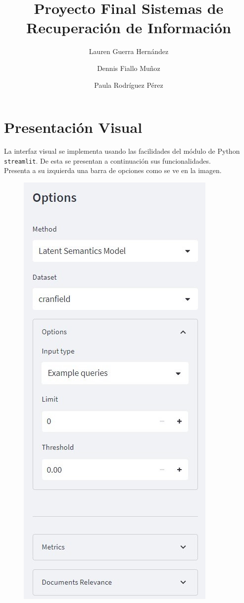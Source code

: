 \documentclass[spanish]{article}
\title{Proyecto Final Sistemas de Recuperación de Información}
\author{Lauren Guerra Hernández \and Dennis Fiallo Muñoz \and Paula Rodríguez Pérez}
\begin{document}
\maketitle

\section*{Presentación Visual}
	La interfaz visual se implementa usando las facilidades del módulo de Python \texttt{streamlit}. De esta se presentan a continuación sus funcionalidades.\\

	Presenta a su izquierda una barra de opciones como se ve en la imagen.

	\begin{multicols}{2}
		\begin{figure}[H]
			\includegraphics[scale=0.5]{visual.jpg}
		\end{figure}	
	

\end{multicols}
\end{document}
